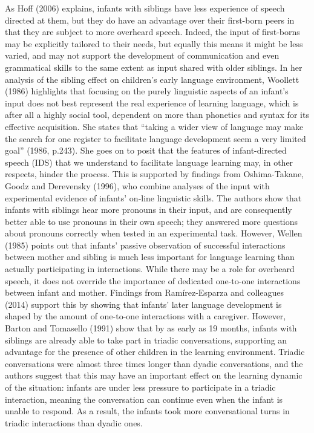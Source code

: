 \documentclass[man,floatsintext]{apa6}
\begin{document}
As Hoff (2006) explains, infants with siblings have less experience of speech directed at them, but they do have an advantage over their first-born peers in that they are subject to more overheard speech. Indeed, the input of first-borns may be explicitly tailored to their needs, but equally this means it might be less varied, and may not support the development of communication and even grammatical skills to the same extent as input shared with older siblings. In her analysis of the sibling effect on children's early language environment, Woollett (1986) highlights that focusing on the purely linguistic aspects of an infant's input does not best represent the real experience of learning language, which is after all a highly social tool, dependent on more than phonetics and syntax for its effective acquisition. She states that \enquote{taking a wider view of language may make the search for one register to facilitate language development seem a very limited goal} (1986, p.243). She goes on to posit that the features of infant-directed speech (IDS) that we understand to facilitate language learning may, in other respects, hinder the process. This is supported by findings from Oshima-Takane, Goodz and Derevensky (1996), who combine analyses of the input with experimental evidence of infants' on-line linguistic skills. The authors show that infants with siblings hear more pronouns in their input, and are consequently better able to use pronouns in their own speech; they answered more questions about pronouns correctly when tested in an experimental task. However, Wellen (1985) points out that infants' passive observation of successful interactions between mother and sibling is much less important for language learning than actually participating in interactions. While there may be a role for overheard speech, it does not override the importance of dedicated one-to-one interactions between infant and mother. Findings from Ramírez-Esparza and colleagues (2014) support this by showing that infants' later language development is shaped by the amount of one-to-one interactions with a caregiver. However, Barton and Tomasello (1991) show that by as early as 19 months, infants with siblings are already able to take part in triadic conversations, supporting an advantage for the presence of other children in the learning environment. Triadic conversations were almost three times longer than dyadic conversations, and the authors suggest that this may have an important effect on the learning dynamic of the situation: infants are under less pressure to participate in a triadic interaction, meaning the conversation can continue even when the infant is unable to respond. As a result, the infants took more conversational turns in triadic interactions than dyadic ones.
\end{document}
